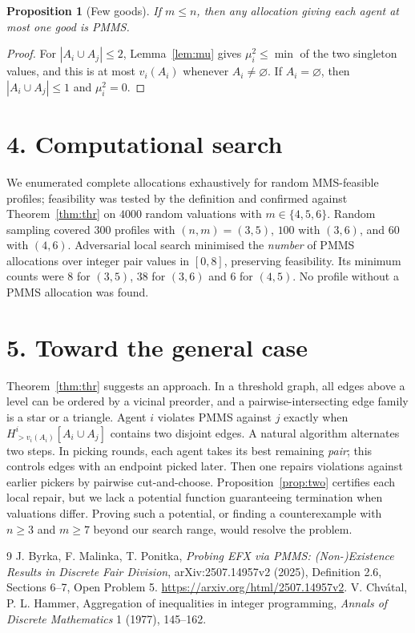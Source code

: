 \documentclass[11pt]{article}
\newtheorem{proposition}[theorem]{Proposition}
\theoremstyle{definition}
\begin{document}
\begin{proposition}[Few goods]\label{prop:few}
If $m\le n$, then any allocation giving each agent at most one good is PMMS.
\end{proposition}
\begin{proof}
For $|A_i\cup A_j|\le2$, Lemma~\ref{lem:mu} gives $\mu^2_i\le\min$ of the two singleton values, and this is at most
$v_i(A_i)$ whenever $A_i\ne\varnothing$. If $A_i=\varnothing$, then $|A_i\cup A_j|\le1$ and $\mu^2_i=0$.
\end{proof}

\section*{4. Computational search}
We enumerated complete allocations exhaustively for random MMS-feasible profiles; feasibility was tested by the
definition and confirmed against Theorem~\ref{thm:thr} on $4000$ random valuations with $m\in\{4,5,6\}$. Random sampling
covered $300$ profiles with $(n,m)=(3,5)$, $100$ with $(3,6)$, and $60$ with $(4,6)$. Adversarial local search minimised the
\emph{number} of PMMS allocations over integer pair values in $[0,8]$, preserving feasibility. Its minimum counts were $8$
for $(3,5)$, $38$ for $(3,6)$ and $6$ for $(4,5)$. No profile without a PMMS allocation was found.

\section*{5. Toward the general case}
Theorem~\ref{thm:thr} suggests an approach. In a threshold graph, all edges above a level can be ordered by a vicinal
preorder, and a pairwise-intersecting edge family is a star or a triangle. Agent $i$ violates PMMS against $j$ exactly when
$H^i_{>v_i(A_i)}[A_i\cup A_j]$ contains two disjoint edges. A natural algorithm alternates two steps. In picking rounds, each
agent takes its best remaining \emph{pair}; this controls edges with an endpoint picked later. Then one repairs violations
against earlier pickers by pairwise cut-and-choose. Proposition~\ref{prop:two} certifies each local repair, but we lack a
potential function guaranteeing termination when valuations differ. Proving such a potential, or finding a counterexample
with $n\ge3$ and $m\ge7$ beyond our search range, would resolve the problem.

\begin{thebibliography}{9}
 J. Byrka, F. Malinka, T. Ponitka, \emph{Probing EFX via PMMS: (Non-)Existence Results in Discrete Fair
Division}, arXiv:2507.14957v2 (2025), Definition 2.6, Sections 6--7, Open Problem 5. \url{https://arxiv.org/html/2507.14957v2}.
 V. Chv\'atal, P. L. Hammer, Aggregation of inequalities in integer programming, \emph{Annals of Discrete
Mathematics} 1 (1977), 145--162.
\end{thebibliography}
\end{document}
